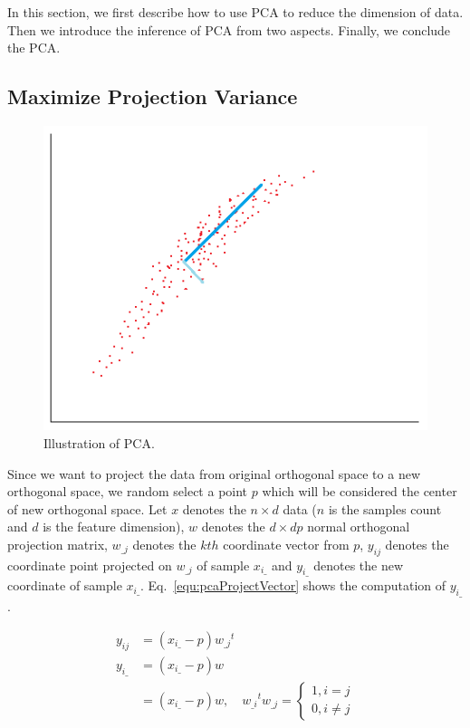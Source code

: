 \documentclass[runningheads,openany]{xhlPaper}
\begin{document}
In this section, we first describe how to use PCA to reduce the dimension of data. Then we introduce the inference of PCA from two aspects. Finally, we conclude the PCA.

\subsection{Maximize Projection Variance}
\label{sec:pcaMPV}
\begin{figure}
\centering
\includegraphics[width=0.6\linewidth]{pcaTwoDimensions}
\caption{Illustration of PCA.}
\label{fig:pcaTwoDimensions}
\end{figure}

Since we want to project the data from original orthogonal space to a new orthogonal space, we random select a point $p$ which will be considered the center of new orthogonal space. 
Let $x$ denotes the $n \times d$ data ($n$ is the samples count and $d$ is the feature dimension), $w$ denotes the $d \times dp$ normal orthogonal projection matrix, $w_{\_j}$ denotes the $kth$ coordinate vector from $p$, ${y_{ij}}$ denotes the coordinate point projected on $w_{\_j}$ of sample $x_{i\_}$ and ${y_{i\_}}$ denotes the new coordinate of sample $x_{i\_}$. Eq.~\ref{equ:pcaProjectVector} shows the computation of ${y_{i\_}}$.

\begin{equation}
\label{equ:pcaProjectVector}
\begin{aligned}
{y_{ij}} &= \left( {{x_{i\_}} - p} \right){w_{\_j}}^t\\
{y_{i\_}} &= \left( {{x_{i\_}} - p} \right)w\\
&= \left( {{x_{i\_}} - p} \right)w,\quad {w_{\_i}}^t{w_{\_j}} = \left\{ {\begin{array}{*{20}{c}}
{1,i = j}\\
{0,i \ne j}
\end{array}} \right.
\end{aligned}
\end{equation}
\end{document}
